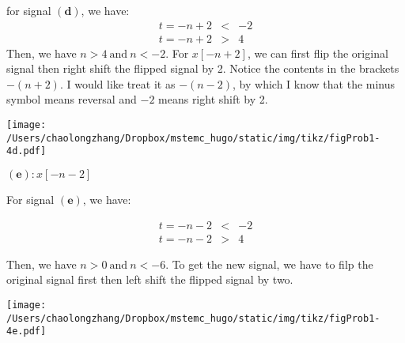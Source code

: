 \documentclass[koma,a4paper,utopia,12pt,listings-color,microtype,paralist,colorlinks,urlcolor=red]{org-article}
\begin{document}
for signal \(\mathbf{(d)}\), we have:
\begin{eqnarray*}
t=-n+2&<&-2 \\
t=-n+2&>&4
\end{eqnarray*}
Then, we have \(n>4\ \mathrm{and}\ n<-2\). For \(x[-n+2]\), we can first
flip the original signal then right shift the flipped signal by 2. Notice the
contents in the brackets \(-(n+2)\). I would like treat it as \(-(n-2)\), by
which I know that the minus symbol means reversal and \(-2\) means right
shift by 2.

\begin{center}
\texttt{[image: /Users/chaolongzhang/Dropbox/mstemc\_hugo/static/img/tikz/figProb1-4d.pdf]}
\end{center}



\(\mathbf{(e)}: x[-n-2]\)

For signal \(\mathbf{(e)}\), we have:

\begin{eqnarray*}
t=-n-2&<&-2 \\
t=-n-2&>&4
\end{eqnarray*}

Then, we have \(n>0 \ \mathrm{and}\ n<-6\). To get the new signal, we have
to filp the original signal first then left shift the flipped signal by two.

\begin{center}
\texttt{[image: /Users/chaolongzhang/Dropbox/mstemc\_hugo/static/img/tikz/figProb1-4e.pdf]}
\end{center}
\end{document}
